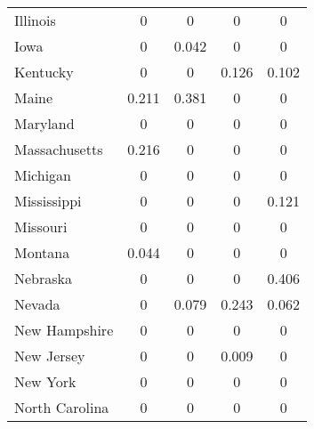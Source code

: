 \documentclass[../Main.tex]{subfiles}
\begin{document}
\begin{table}[htbp]
\begin{tabular}{@{\extracolsep{4pt}}l*{8}{c}}
\multicolumn{1}{l}{Illinois} & \multicolumn{2}{c}{0} & \multicolumn{2}{c}{0} & \multicolumn{2}{c}{0} & \multicolumn{2}{c}{0}\\
\multicolumn{1}{l}{Iowa} & \multicolumn{2}{c}{0} & \multicolumn{2}{c}{0.042} & \multicolumn{2}{c}{0} & \multicolumn{2}{c}{0}\\
\multicolumn{1}{l}{Kentucky} & \multicolumn{2}{c}{0} & \multicolumn{2}{c}{0} & \multicolumn{2}{c}{0.126} & \multicolumn{2}{c}{0.102}\\
\multicolumn{1}{l}{Maine} & \multicolumn{2}{c}{0.211} & \multicolumn{2}{c}{0.381} & \multicolumn{2}{c}{0} & \multicolumn{2}{c}{0}\\
\multicolumn{1}{l}{Maryland} & \multicolumn{2}{c}{0} & \multicolumn{2}{c}{0} & \multicolumn{2}{c}{0} & \multicolumn{2}{c}{0}\\
\multicolumn{1}{l}{Massachusetts} & \multicolumn{2}{c}{0.216} & \multicolumn{2}{c}{0} & \multicolumn{2}{c}{0} & \multicolumn{2}{c}{0}\\
\multicolumn{1}{l}{Michigan} & \multicolumn{2}{c}{0} & \multicolumn{2}{c}{0} & \multicolumn{2}{c}{0} & \multicolumn{2}{c}{0}\\
\multicolumn{1}{l}{Mississippi} & \multicolumn{2}{c}{0} & \multicolumn{2}{c}{0} & \multicolumn{2}{c}{0} & \multicolumn{2}{c}{0.121}\\
\multicolumn{1}{l}{Missouri} & \multicolumn{2}{c}{0} & \multicolumn{2}{c}{0} & \multicolumn{2}{c}{0} & \multicolumn{2}{c}{0}\\
\multicolumn{1}{l}{Montana} & \multicolumn{2}{c}{0.044} & \multicolumn{2}{c}{0} & \multicolumn{2}{c}{0} & \multicolumn{2}{c}{0}\\
\multicolumn{1}{l}{Nebraska} & \multicolumn{2}{c}{0} & \multicolumn{2}{c}{0} & \multicolumn{2}{c}{0} & \multicolumn{2}{c}{0.406}\\
\multicolumn{1}{l}{Nevada} & \multicolumn{2}{c}{0} & \multicolumn{2}{c}{0.079} & \multicolumn{2}{c}{0.243} & \multicolumn{2}{c}{0.062}\\
\multicolumn{1}{l}{New Hampshire} & \multicolumn{2}{c}{0} & \multicolumn{2}{c}{0} & \multicolumn{2}{c}{0} & \multicolumn{2}{c}{0}\\
\multicolumn{1}{l}{New Jersey} & \multicolumn{2}{c}{0} & \multicolumn{2}{c}{0} & \multicolumn{2}{c}{0.009} & \multicolumn{2}{c}{0}\\
\multicolumn{1}{l}{New York} & \multicolumn{2}{c}{0} & \multicolumn{2}{c}{0} & \multicolumn{2}{c}{0} & \multicolumn{2}{c}{0}\\
\multicolumn{1}{l}{North Carolina} & \multicolumn{2}{c}{0} & \multicolumn{2}{c}{0} & \multicolumn{2}{c}{0} & \multicolumn{2}{c}{0}\\

\end{tabular}
\end{table}
\end{document}
